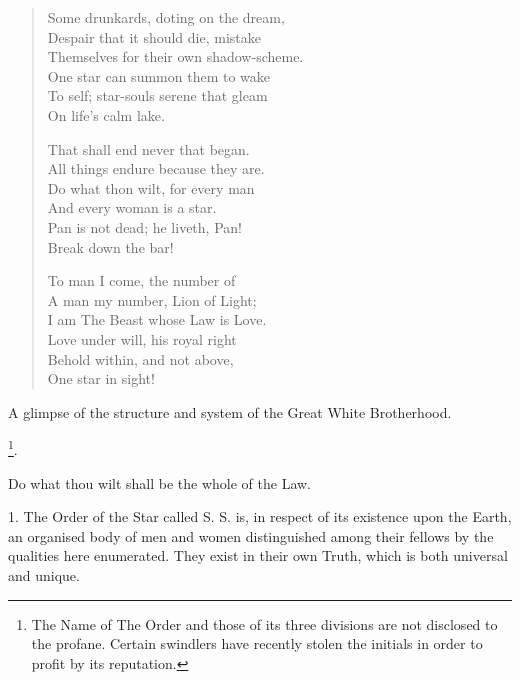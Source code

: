 \begin{verse}
  Some drunkards, doting on the dream, \\
  \hspace{1em}Despair that it should die, mistake \\
  Themselves for their own shadow-scheme. \\
  \hspace{1em}One star can summon them to wake \\
  To self; star-souls serene that gleam \\
  \hspace{1em}On life's calm lake.

  That shall end never that began. \\
  \hspace{1em}All things endure because they are. \\
  Do what thon wilt, for every man \\
  \hspace{1em}And every woman is a star. \\
  Pan is not dead; he liveth, Pan! \\
  \hspace{1em}Break down the bar!

  To man I come, the number of \\
  \hspace{1em}A man my number, Lion of Light; \\
  I am The Beast whose Law is Love. \\
  \hspace{1em}Love under will, his royal right \textemdash{} \\
  Behold within, and not above, \\
  \hspace{1em}One star in sight!
\end{verse}


A glimpse of the structure and system of the Great White Brotherhood.

{\centering
  \Argentium{}\footnote{The Name of The Order and those of its three divisions are not disclosed to the profane. Certain swindlers have recently stolen the initials \Argentium{} in order to profit by its reputation.}.
\par}

Do what thou wilt shall be the whole of the Law.

1. The Order of the Star called S. S. is, in respect of its existence upon the Earth, an organised body of men and women distinguished among their fellows by the qualities here enumerated. They exist in their own Truth, which is both universal and unique.

